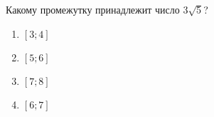  
\begin{ex}
	Какому промежутку принадлежит число $3\sqrt{5}$?
	
	\selectanswer
	\begin{multicols}{4}
		\begin{enumerate}[label=\arabic*)]
			\item $[3;4]$
			\item $[5;6]$
			\item $[7;8]$
			\item $[6;7]$
		\end{enumerate}
	\end{multicols}
\end{ex}